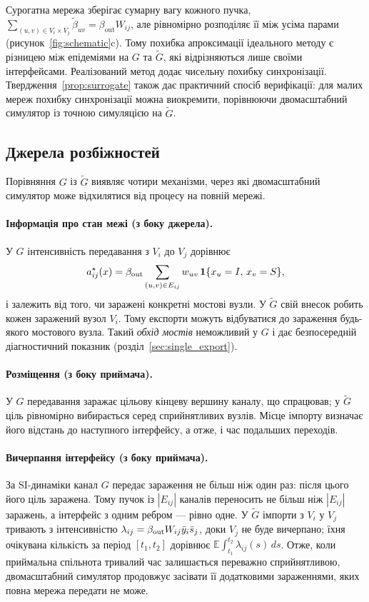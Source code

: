 Сурогатна мережа зберігає сумарну вагу кожного пучка, $\sum_{(u,v)\in V_i\times V_j}\tilde\beta_{uv}=\beta_{\mathrm{out}}W_{ij}$, але рівномірно розподіляє її між усіма парами (рисунок~\ref{fig:schematic}c). Тому похибка апроксимації ідеального методу є різницею між епідеміями на $G$ та $\tilde G$, які відрізняються лише своїми інтерфейсами. Реалізований метод додає чисельну похибку синхронізації. Твердження~\ref{prop:surrogate} також дає практичний спосіб верифікації: для малих мереж похибку синхронізації можна виокремити, порівнюючи двомасштабний симулятор із точною симуляцією на $\tilde G$.

\subsection{Джерела розбіжностей}
\label{sec:sources}

Порівняння $G$ із $\tilde G$ виявляє чотири механізми, через які двомасштабний симулятор може відхилятися від процесу на повній мережі.

\paragraph{Інформація про стан межі (з боку джерела).}
У $G$ інтенсивність передавання з $V_i$ до $V_j$ дорівнює
\begin{equation}
\label{eq:exact_rate}
a^\star_{ij}(x)=\beta_{\mathrm{out}}\sum_{(u,v)\in E_{ij}}w_{uv}\,\mathbf{1}\{x_u=I,\,x_v=S\},
\end{equation}
і залежить від того, чи заражені конкретні мостові вузли. У $\tilde G$ свій внесок робить кожен заражений вузол $V_i$. Тому експорти можуть відбуватися до зараження будь-якого мостового вузла. Такий \emph{обхід мостів} неможливий у $G$ і дає безпосередній діагностичний показник (розділ~\ref{sec:single_export}).

\paragraph{Розміщення (з боку приймача).}
У $G$ передавання заражає цільову кінцеву вершину каналу, що спрацював; у $\tilde G$ ціль рівномірно вибирається серед сприйнятливих вузлів. Місце імпорту визначає його відстань до наступного інтерфейсу, а отже, і час подальших переходів.

\paragraph{Вичерпання інтерфейсу (з боку приймача).}
За SI-динаміки канал $G$ передає зараження не більш ніж один раз: після цього його ціль заражена. Тому пучок із $|E_{ij}|$ каналів переносить не більш ніж $|E_{ij}|$ заражень, а інтерфейс з одним ребром --- рівно одне. У $\tilde G$ імпорти з $V_i$ у $V_j$ тривають з інтенсивністю $\lambda_{ij}=\beta_{\mathrm{out}}W_{ij}\bar{y}_i\bar{s}_j$, доки $V_j$ не буде вичерпано; їхня очікувана кількість за період $[t_1,t_2]$ дорівнює $\mathbb{E}\int_{t_1}^{t_2}\lambda_{ij}(s)\,ds$. Отже, коли приймальна спільнота тривалий час залишається переважно сприйнятливою, двомасштабний симулятор продовжує засівати її додатковими зараженнями, яких повна мережа передати не може.

